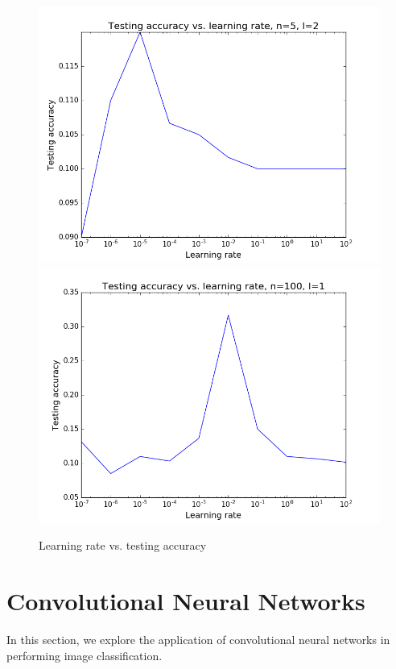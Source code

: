 \documentclass{article}
\begin{document}
\begin{figure}[width=\linewidth]
\centering
\begin{multicols}{2}
  \includegraphics[width=1.2\linewidth]{code/P1/accuracy_vs_learning_rate,mnist,(5,5).png}
  \includegraphics[width=1.2\linewidth]{code/P1/accuracy_vs_learning_rate,mnist,(100).png}
\end{multicols}
\caption{Learning rate vs. testing accuracy}
\end{figure}


\section{Convolutional Neural Networks}
In this section, we explore the application of convolutional neural networks in performing image classification.
\end{document}
